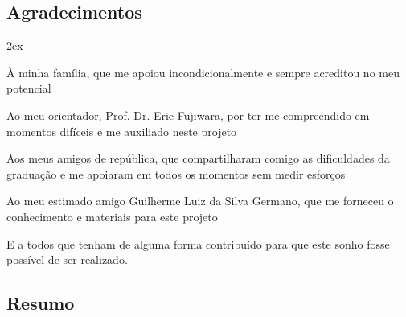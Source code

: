 \clearpage
\clearpage
\begin{center}
\chapter*{Agradecimentos}
\end{center}
\vspace*{1cm}
\begin{trivlist}  \itemsep 2ex  \normalsize

\item À minha família, que me apoiou incondicionalmente e sempre acreditou no meu potencial

\item Ao meu orientador, Prof. Dr. Eric Fujiwara, por ter me compreendido em momentos difíceis e me auxiliado neste projeto

\item Aos meus amigos de república, que compartilharam comigo as dificuldades da graduação e me apoiaram em todos os momentos sem medir esforços

\item Ao meu estimado amigo Guilherme Luiz da Silva Germano, que me forneceu o conhecimento e materiais para este projeto

\item E a todos que tenham de alguma forma contribuído para que este sonho fosse possível de ser realizado.

\end{trivlist}




\clearpage

\begin{center}
\chapter*{Resumo}
\end{center}
\vspace{24pt}
\onehalfspacing
\noindent

